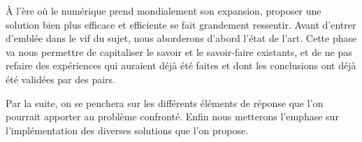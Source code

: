 À l'ère où le numérique prend mondialement son expansion, proposer une solution bien plus 
efficace et efficiente se fait grandement ressentir. 
Avant d'entrer d'emblée dans le vif du sujet, nous aborderons 
d'abord l'état de l'art. Cette phase va nous permettre de capitaliser le 
savoir et le savoir-faire existants, et de ne pas refaire des expériences 
qui auraient déjà été faites et dont les conclusions ont déjà été validées 
par des pairs.
\par
Par la suite, on se penchera sur les différents éléments de réponse que l'on 
pourrait apporter au problème confronté.
Enfin nous metterons l'emphase sur l'implémentation des diverses solutions 
que l'on propose.
